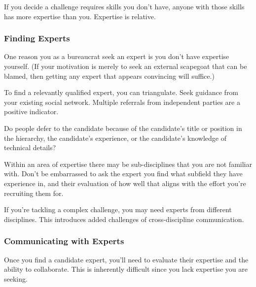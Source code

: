 If you decide a challenge requires skills you don't have, anyone with those skills has more expertise than you. Expertise is relative. 

\subsubsection*{Finding Experts}

One reason you as a bureaucrat seek an expert is you don't have expertise yourself. (If your motivation is merely to seek an external scapegoat that can be blamed, then getting any expert that appears convincing will suffice.)

To find a relevantly qualified expert, you can triangulate. Seek guidance from your existing social network. Multiple referrals from independent parties are a positive indicator. 

Do people defer to the candidate because of the candidate's title or position in the hierarchy, the candidate's experience, or the candidate's knowledge of technical details?

Within an area of expertise there may be sub-disciplines that you are not familiar with. Don't be embarrassed to ask the expert you find what subfield they have experience in, and their evaluation of how well that aligns with the effort you're recruiting them for.

If you're tackling a complex challenge, you may need experts from different disciplines. This introduces added challenges of cross-discipline communication. 





\subsubsection*{Communicating with Experts}
Once you find a candidate expert, you'll need to evaluate their expertise and the ability to collaborate. This is inherently difficult since you lack expertise you are seeking. 

